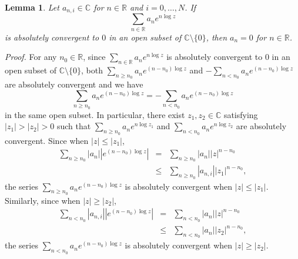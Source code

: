 \documentclass[12pt]{article}
\newtheorem{lemma}[thm]{Lemma}
\newcommand{\nn}{\nonumber \\}
\newcommand{\pf}{{\it Proof.}\hspace{2ex}}
\newcommand{\C}{\mathbb{C}}
\newcommand{\R}{\mathbb{R}}
\begin{document}
\begin{lemma}
Let $a_{n, i}\in \C$ for $n\in \R$ and $i=0, \dots, N$.
If 
\[
\sum_{n\in \R}a_{n}e^{n\log z}
\]
is absolutely convergent to $0$ in an open subset of $\C\setminus \{0\}$,
then $a_{n}=0$ for $n\in \R$.
\end{lemma}
\pf 
For any $n_{0}\in \R$, since $\sum_{n\in \R}
a_{n}e^{n\log z}$
is absolutely convergent to $0$ in an open subset of $\C\setminus \{0\}$,
both $\sum_{n\ge n_{0}}a_{n}e^{(n-n_{0})\log z}$
and $-\sum_{n< n_{0}}a_{n}e^{(n-n_{0})\log z}$
are absolutely convergent and we have
\[
\sum_{n\ge n_{0}}a_{n}e^{(n-n_{0})\log z}
=-\sum_{n< n_{0}}a_{n}e^{(n-n_{0})\log z}
\]
in the same open subset. In particular, there exist
$z_{1}, z_{2}\in \C$ satisfying $|z_{1}|>|z_{2}|>0$ such that 
$\sum_{n\ge n_{0}}a_{n}e^{n\log z_{1}}$ and 
$\sum_{n< n_{0}}a_{n}e^{n\log z_{2}}$ 
are absolutely convergent. Since when $|z|\le |z_{1}|$,
\begin{eqnarray*}
\sum_{n\ge n_{0}}|a_{n}||e^{(n-n_{0})\log z}|
&= &\sum_{n\ge n_{0}}|a_{n}||z|^{n-n_{0}}\nn
&\le &\sum_{n\ge n_{0}}|a_{n, i}||z_{1}|^{n-n_{0}},
\end{eqnarray*}
the series 
$\sum_{n\ge n_{0}}a_{n}e^{(n-n_{0})\log z}$
is absolutely convergent when $|z|\le |z_{1}|$.
Similarly, since when $|z|\ge |z_{2}|$,
\begin{eqnarray*}
\sum_{n< n_{0}}|a_{n, i}||e^{(n-n_{0})\log z}|
&= &\sum_{n< n_{0}}|a_{n}||z|^{n-n_{0}}\nn
&\le &\sum_{n< n_{0}}|a_{n}||z_{2}|^{n-n_{0}},
\end{eqnarray*}
the series 
$\sum_{n< n_{0}}a_{n}e^{(n-n_{0})\log z}$
is absolutely convergent when $|z|\ge |z_{2}|$.
\end{document}
